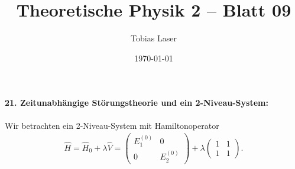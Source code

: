 \documentclass[11pt,a4paper]{scrartcl}
\newcommand{\op}[1]{\hat{#1}}
\begin{document}
    \title{Theoretische Physik 2 -- Blatt 09}
    \author{Tobias Laser}
    \date{\today}
    \maketitle
    \vfill
    \thispagestyle{empty}
    \newpage


    \paragraph{21. Zeitunabhängige Störungstheorie und ein 2-Niveau-System:}

    Wir betrachten ein 2-Niveau-System mit Hamiltonoperator
    \begin{align*}
        \op H
        =
        \op H_0 + \lambda \op V
        =
        \begin{pmatrix}
            E_1^{(0)} & 0 \\
            0 & E_2^{(0)}
        \end{pmatrix}
        +
        \lambda
        \begin{pmatrix}
            1 & 1 \\
            1 & 1
        \end{pmatrix}.
    \end{align*}
\end{document}
